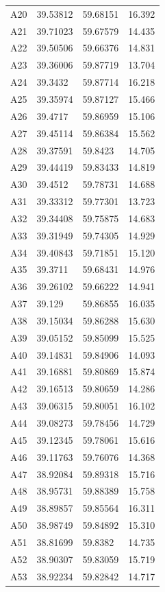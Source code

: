 \documentclass[useAMS,usenatbib]{mn2e}
\begin{document}
\begin{table}
\begin{tabular}{lllc}
	A20 & 39.53812 & 59.68151 & 16.392 \\
	A21 & 39.71023 & 59.67579 & 14.435 \\
	A22 & 39.50506 & 59.66376 & 14.831 \\
	A23 & 39.36006 & 59.87719 & 13.704 \\
	A24 & 39.3432 & 59.87714 & 16.218 \\
	A25 & 39.35974 & 59.87127 & 15.466 \\
	A26 & 39.4717 & 59.86959 & 15.106 \\
	A27 & 39.45114 & 59.86384 & 15.562 \\
	A28 & 39.37591 & 59.8423 & 14.705 \\
	A29 & 39.44419 & 59.83433 & 14.819 \\
	A30 & 39.4512 & 59.78731 & 14.688 \\
	A31 & 39.33312 & 59.77301 & 13.723 \\
	A32 & 39.34408 & 59.75875 & 14.683 \\
	A33 & 39.31949 & 59.74305 & 14.929 \\
	A34 & 39.40843 & 59.71851 & 15.120 \\
	A35 & 39.3711 & 59.68431 & 14.976 \\
	A36 & 39.26102 & 59.66222 & 14.941 \\
	A37 & 39.129 & 59.86855 & 16.035 \\
	A38 & 39.15034 & 59.86288 & 15.630 \\
	A39 & 39.05152 & 59.85099 & 15.525 \\
	A40 & 39.14831 & 59.84906 & 14.093 \\
	A41 & 39.16881 & 59.80869 & 15.874 \\
	A42 & 39.16513 & 59.80659 & 14.286 \\
	A43 & 39.06315 & 59.80051 & 16.102 \\
	A44 & 39.08273 & 59.78456 & 14.729 \\
	A45 & 39.12345 & 59.78061 & 15.616 \\
	A46 & 39.11763 & 59.76076 & 14.368 \\
	A47 & 38.92084 & 59.89318 & 15.716 \\
	A48 & 38.95731 & 59.88389 & 15.758 \\
	A49 & 38.89857 & 59.85564 & 16.311 \\
	A50 & 38.98749 & 59.84892 & 15.310 \\
	A51 & 38.81699 & 59.8382 & 14.735 \\
	A52 & 38.90307 & 59.83059 & 15.719 \\
	A53 & 38.92234 & 59.82842 & 14.717 \\

\end{tabular}
\end{table}
\end{document}
